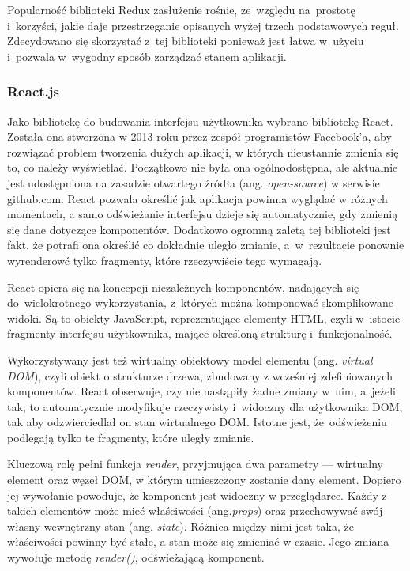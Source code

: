 \documentclass[11pt,a4paper,polish,thesis]{dcsbook}
\begin{document}
	Popularność biblioteki Redux zasłużenie rośnie, ze~względu na~prostotę i~korzyści, jakie daje przestrzeganie opisanych wyżej trzech podstawowych reguł. Zdecydowano się skorzystać z~tej biblioteki ponieważ jest łatwa w~użyciu i~pozwala w~wygodny sposób zarządzać stanem aplikacji. 
	
	\subsubsection{React.js}
	 
	 Jako bibliotekę do budowania interfejsu użytkownika wybrano bibliotekę React. 
	 Została ona stworzona w 2013 roku przez zespół programistów Facebook'a, aby rozwiązać problem tworzenia dużych aplikacji, w których nieustannie zmienia się to, co należy wyświetlać. Początkowo nie była ona ogólnodostępna, ale aktualnie jest udostępniona na zasadzie otwartego źródła (ang. \textit{open-source}) w serwisie github.com. React pozwala określić jak aplikacja powinna wyglądać w różnych momentach, a samo odświeżanie interfejsu dzieje się automatycznie, gdy zmienią się dane dotyczące komponentów. Dodatkowo ogromną zaletą tej biblioteki jest fakt, że potrafi ona określić co dokładnie uległo zmianie, a~w~rezultacie ponownie wyrenderowć tylko fragmenty, które rzeczywiście tego wymagają.
	 
	 React opiera się na koncepcji niezależnych komponentów, nadających się do~wielokrotnego wykorzystania, z~których można komponować skomplikowane widoki. Są to obiekty JavaScript, reprezentujące elementy HTML, czyli w~istocie fragmenty interfejsu użytkownika, mające określoną strukturę i~funkcjonalność.
	 
	 Wykorzystywany jest też wirtualny obiektowy model elementu (ang. \textit{virtual DOM}), czyli obiekt o strukturze drzewa, zbudowany z wcześniej zdefiniowanych komponentów. React obserwuje, czy nie nastąpiły żadne zmiany w~nim, a~jeżeli tak, to automatycznie modyfikuje rzeczywisty i~widoczny dla użytkownika DOM, tak aby odzwierciedlał on stan wirtualnego DOM. Istotne jest, że~odświeżeniu podlegają tylko te fragmenty, które uległy zmianie.
	 
	 Kluczową rolę pełni funkcja \textit{render}, przyjmująca dwa parametry --- wirtualny element oraz węzeł DOM, w którym umieszczony zostanie dany element. Dopiero jej wywołanie powoduje, że komponent jest widoczny w przeglądarce. Każdy z takich elementów może mieć właściwości (ang.\textit{props}) oraz przechowywać swój własny wewnętrzny stan (ang. \textit{state}). Różnica między nimi jest taka, że właściwości powinny być stałe, a stan może się zmieniać w czasie. Jego zmiana wywołuje metodę \textit{render()}, odświeżającą komponent.
	
\end{document}
